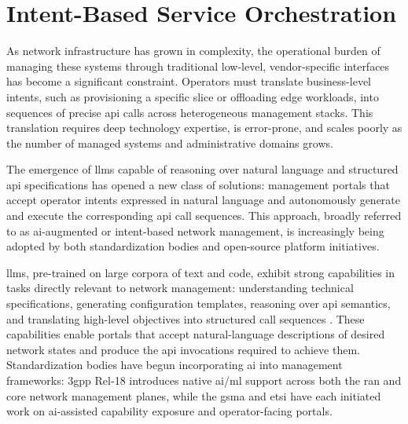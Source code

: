 \section{Intent-Based Service Orchestration}
\label{sec:ai-driven-management}

As network infrastructure has grown in complexity, the operational burden of managing these systems through traditional low-level, vendor-specific interfaces has become a significant constraint. Operators must translate business-level intents, such as provisioning a specific slice or offloading edge workloads, into sequences of precise \ac{api} calls across heterogeneous management stacks. This translation requires deep technology expertise, is error-prone, and scales poorly as the number of managed systems and administrative domains grows.

The emergence of \acp{llm} capable of reasoning over natural language and structured \ac{api} specifications has opened a new class of solutions: management portals that accept operator intents expressed in natural language and autonomously generate and execute the corresponding \ac{api} call sequences. This approach, broadly referred to as \ac{ai}-augmented or intent-based network management, is increasingly being adopted by both standardization bodies and open-source platform initiatives.

\acp{llm}, pre-trained on large corpora of text and code, exhibit strong capabilities in tasks directly relevant to network management: understanding technical specifications, generating configuration templates, reasoning over \ac{api} semantics, and translating high-level objectives into structured call sequences \cite{ZhouLargeLanguageModelLLMTelecommunications2025}. These capabilities enable portals that accept natural-language descriptions of desired network states and produce the \ac{api} invocations required to achieve them. Standardization bodies have begun incorporating \ac{ai} into management frameworks: \ac{3gpp} \mbox{Rel-18} introduces native \ac{ai}/\ac{ml} support across both the \ac{ran} and core network management planes, while the \ac{gsma} and \ac{etsi} have each initiated work on \ac{ai}-assisted capability exposure and operator-facing portals.

